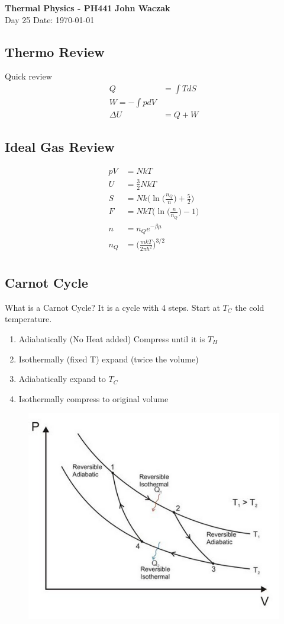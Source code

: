 \documentclass[a4paper, 11pt]{article}
\begin{document}
	\noindent
	\large\textbf{Thermal Physics - PH441} \hfill \textbf{John Waczak} \\
	\normalsize Day 25 \hfill  Date: \today \\
	
\subsection*{Thermo Review} 
	Quick review 
		\begin{align*}
			Q &= \int T dS \\ 
			W = - \int p dV \\ 
			\Delta U &= Q + W 
		\end{align*}

\subsection*{Ideal Gas Review} 
	\begin{align*}
		pV &= NkT \\ 
		U &= \frac{3}{2}NkT \\ 
		S &= Nk\Big(\ln\Big(\frac{n_Q}{n}\Big)+\frac{5}{2}\Big) \\ 
		F &= NkT\Big(\ln\Big(\frac{n}{n_Q}\Big)-1\Big) \\ 
		n &= n_Qe^{-\beta \mu} \\ 
		n_Q &= \Big(\frac{mkT}{2\pi \hbar^2}\Big)^{3/2} \\ 
	\end{align*}
	
\subsection*{Carnot Cycle} 
	What is a Carnot Cycle? It is a cycle with 4 steps. Start at $T_C$ the cold temperature. 
		\begin{enumerate}
			\item	Adiabatically (No Heat added) Compress until it is $T_H$ 
			\item 	Isothermally (fixed T) expand  (twice the volume) 
			\item 	Adiabatically expand to $T_C$ 
			\item 	Isothermally compress to original volume 
		\end{enumerate}
		\begin{figure}[!hbt]
			\centering
			\includegraphics[width=0.65\columnwidth]{carnot}
		\end{figure}
		
\end{document}
